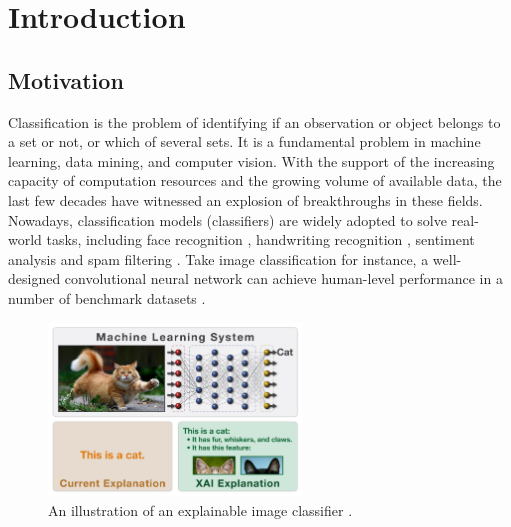 \chapter{Introduction}\label{sec-introduction}
\section{Motivation}


Classification is the problem of identifying if an observation or object belongs to a set or not, or which of several sets. It is a fundamental problem in machine learning, data mining, and computer vision. With the support of the increasing capacity of computation resources and the growing volume of available data, the last few decades have witnessed an explosion of breakthroughs in these fields. Nowadays, classification models (classifiers) are widely adopted to solve real-world tasks, including face recognition \cite{wright2009robust}, handwriting recognition \cite{lecun1990handwritten}, sentiment analysis \cite{pang2002thumbs} and spam filtering \cite{androutsopoulos2000spam}. Take image classification for instance, a well-designed convolutional neural network can achieve human-level performance in a number of benchmark datasets \cite{he2016resnet}. 


\begin{figure}[hb]
  \centering
  \includegraphics[width=0.6\textwidth]{figure/explain_cat}
  \caption{An illustration of an explainable image classifier \cite{darpa2017xai}.}
  \label{fig:explain-cat}
\end{figure}

